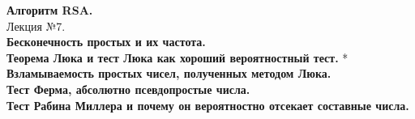 \documentclass[12pt]{article}
\begin{document}
\textbf{Алгоритм RSA.}\\

Лекция №7.\\
\textbf{Бесконечность простых и их частота.}\\

\textbf{Теорема Люка и тест Люка как хороший вероятностный тест.} *\\

\textbf{Взламываемость простых чисел, полученных методом Люка.}\\

\textbf{Тест Ферма, абсолютно псевдопростые числа.}\\

\textbf{Тест Рабина Миллера и почему он вероятностно отсекает составные числа.}\\
\end{document}
